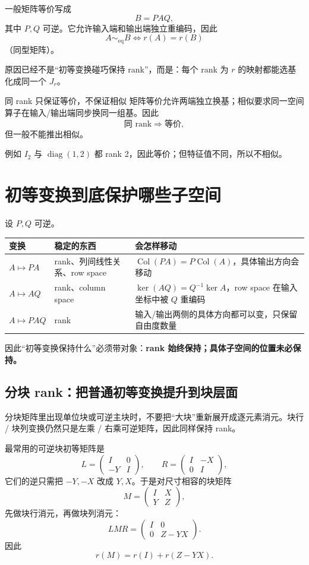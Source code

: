\documentclass[11pt,a4paper]{ctexart}
\newcommand{\kw}[1]{\textbf{\color{deep}#1}}
\begin{document}
一般矩阵等价写成
\[
B=PAQ,
\]
其中 $P,Q$ 可逆。它允许输入端和输出端独立重编码，因此
\[
\boxed{A\sim_{\mathrm{eq}}B\iff r(A)=r(B)}
\]
（同型矩阵）。

原因已经不是“初等变换碰巧保持 rank”，而是：每个 rank 为 $r$ 的映射都能选基化成同一个 $J_r$。

\begin{warnbox}{同 rank 只保证等价，不保证相似}
矩阵等价允许两端独立换基；相似要求同一空间算子在输入/输出端同步换同一组基。因此
\[
\text{同 rank}\Longrightarrow\text{等价},
\]
但一般不能推出相似。

例如 $I_2$ 与 $\operatorname{diag}(1,2)$ 都 rank 2，因此等价；但特征值不同，所以不相似。
\end{warnbox}

\section{初等变换到底保护哪些子空间}

设 $P,Q$ 可逆。

\begin{longtable}{L{2.7cm}L{4.1cm}L{\dimexpr\linewidth-7.3cm\relax}}
\toprule
\textbf{变换} & \textbf{稳定的东西} & \textbf{会怎样移动}\\
\midrule
$A\mapsto PA$ & rank、列间线性关系、row space & $\operatorname{Col}(PA)=P\operatorname{Col}(A)$，具体输出方向会移动\\
$A\mapsto AQ$ & rank、column space & $\ker(AQ)=Q^{-1}\ker A$，row space 在输入坐标中被 $Q$ 重编码\\
$A\mapsto PAQ$ & rank & 输入/输出两侧的具体方向都可以变，只保留自由度数量\\
\bottomrule
\end{longtable}

因此“初等变换保持什么”必须带对象：\kw{rank 始终保持；具体子空间的位置未必保持。}

\subsection{分块 rank：把普通初等变换提升到块层面}

分块矩阵里出现单位块或可逆主块时，不要把“大块”重新展开成逐元素消元。块行 / 块列变换仍然只是左乘 / 右乘可逆矩阵，因此同样保持 rank。

最常用的可逆块初等矩阵是
\[
L=\begin{pmatrix}I&0\\-Y&I\end{pmatrix},
\qquad
R=\begin{pmatrix}I&-X\\0&I\end{pmatrix},
\]
它们的逆只需把 $-Y,-X$ 改成 $Y,X$。于是对尺寸相容的块矩阵
\[
M=\begin{pmatrix}I&X\\Y&Z\end{pmatrix},
\]
先做块行消元，再做块列消元：
\[
LMR
=
\begin{pmatrix}
I&0\\
0&Z-YX
\end{pmatrix}.
\]
因此
\[
\boxed{
r(M)=r(I)+r(Z-YX).
}
\]
\end{document}
